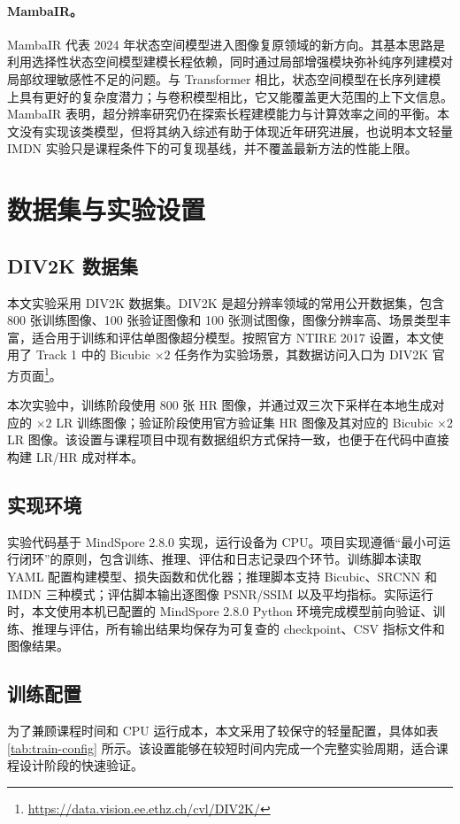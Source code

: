 \documentclass[bwprint]{report}
\begin{document}
\paragraph{MambaIR。}
MambaIR 代表 2024 年状态空间模型进入图像复原领域的新方向\cite{guo2024mambair}。其基本思路是利用选择性状态空间模型建模长程依赖，同时通过局部增强模块弥补纯序列建模对局部纹理敏感性不足的问题。与 Transformer 相比，状态空间模型在长序列建模上具有更好的复杂度潜力；与卷积模型相比，它又能覆盖更大范围的上下文信息。MambaIR 表明，超分辨率研究仍在探索长程建模能力与计算效率之间的平衡。本文没有实现该类模型，但将其纳入综述有助于体现近年研究进展，也说明本文轻量 IMDN 实验只是课程条件下的可复现基线，并不覆盖最新方法的性能上限。

\section{数据集与实验设置}
\subsection{DIV2K 数据集}
本文实验采用 DIV2K 数据集\cite{agustsson2017ntire, timofte2017ntire}。DIV2K 是超分辨率领域的常用公开数据集，包含 800 张训练图像、100 张验证图像和 100 张测试图像，图像分辨率高、场景类型丰富，适合用于训练和评估单图像超分模型。按照官方 NTIRE 2017 设置，本文使用了 Track 1 中的 Bicubic $\times 2$ 任务作为实验场景，其数据访问入口为 DIV2K 官方页面\footnote{\url{https://data.vision.ee.ethz.ch/cvl/DIV2K/}}。

本次实验中，训练阶段使用 800 张 HR 图像，并通过双三次下采样在本地生成对应的 $\times 2$ LR 训练图像；验证阶段使用官方验证集 HR 图像及其对应的 Bicubic $\times 2$ LR 图像。该设置与课程项目中现有数据组织方式保持一致，也便于在代码中直接构建 LR/HR 成对样本。

\subsection{实现环境}
实验代码基于 MindSpore 2.8.0 实现，运行设备为 CPU。项目实现遵循“最小可运行闭环”的原则，包含训练、推理、评估和日志记录四个环节。训练脚本读取 YAML 配置构建模型、损失函数和优化器；推理脚本支持 Bicubic、SRCNN 和 IMDN 三种模式；评估脚本输出逐图像 PSNR/SSIM 以及平均指标。实际运行时，本文使用本机已配置的 MindSpore 2.8.0 Python 环境完成模型前向验证、训练、推理与评估，所有输出结果均保存为可复查的 checkpoint、CSV 指标文件和图像结果。

\subsection{训练配置}
为了兼顾课程时间和 CPU 运行成本，本文采用了较保守的轻量配置，具体如表 \ref{tab:train-config} 所示。该设置能够在较短时间内完成一个完整实验周期，适合课程设计阶段的快速验证。
\end{document}
